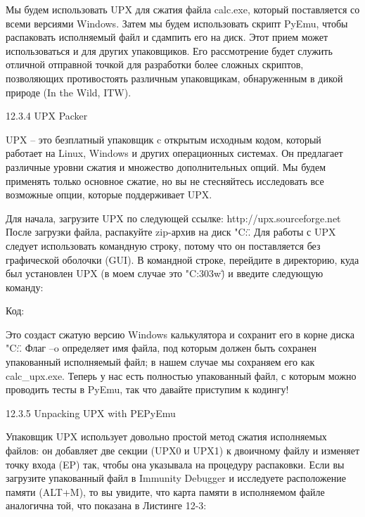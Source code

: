 \documentclass[12pt, a4paper, oneside]{book}
\begin{document}
Мы будем использовать UPX для сжатия файла calc.exe, который поставляется со всеми версиями Windows. Затем мы будем использовать скрипт PyEmu, чтобы распаковать исполняемый файл и сдампить его на диск. Этот прием может использоваться и для других упаковщиков. Его рассмотрение будет служить отличной отправной точкой для разработки более сложных скриптов, позволяющих противостоять различным упаковщикам, обнаруженным в дикой природе (In the Wild, ITW). 

12.3.4 UPX Packer

UPX – это безплатный упаковщик c открытым исходным кодом, который работает на Linux, Windows и других операционных системах. Он предлагает различные уровни сжатия и множество дополнительных опций. Мы будем применять только основное сжатие, но вы не стесняйтесь исследовать все возможные опции, которые поддерживает UPX. 

Для начала, загрузите UPX по следующей ссылке: 
http://upx.sourceforge.net
После загрузки файла, распакуйте zip-архив на диск "C:\". Для работы с UPX следует использовать командную строку, потому что он поставляется без графической оболочки (GUI). В командной строке, перейдите в директорию, куда был установлен UPX (в моем случае это "C:\upx303w\") и введите следующую команду:

Код:



Это создаст сжатую версию Windows калькулятора и сохранит его в корне диска "C:\". Флаг –o определяет имя файла, под которым должен быть сохранен упакованный исполняемый файл; в нашем случае мы сохраняем его как calc\_upx.exe. Теперь у нас есть полностью упакованный файл, с которым можно проводить тесты в PyEmu, так что давайте приступим к кодингу!

12.3.5 Unpacking UPX with PEPyEmu

Упаковщик UPX использует довольно простой метод сжатия исполняемых файлов: он добавляет две секции (UPX0 и UPX1) к двоичному файлу и изменяет точку входа (EP) так, чтобы она указывала на процедуру распаковки. Если вы загрузите упакованный файл в Immunity Debugger и исследуете расположение памяти (ALT+M), то вы увидите, что карта памяти в исполняемом файле аналогична той, что показана в Листинге 12-3:
\end{document}
